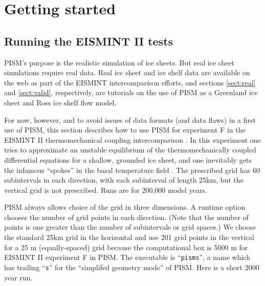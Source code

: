\documentclass[11pt,final]{amsart}
\renewcommand{\t}[1]{\texttt{#1}}
\begin{document}
\clearpage\newpage
\section{Getting started}\label{sect:start}

\subsection{Running the EISMINT II tests}  PISM's purpose is the realistic simulation of ice sheets.  But real ice sheet simulations require real data.  Real ice sheet and ice shelf data are available on the web as part of the EISMINT intercomparison efforts, and sections \ref{sect:real} and \ref{sect:valid}, respectively, are tutorials on the use of PISM as a Greenland ice sheet and Ross ice shelf flow model.

For now, however, and to avoid issues of data formats (and data flaws) in a first use of PISM, this section describes how to use PISM for experiment F in the EISMINT II thermomechanical coupling intercomparison \cite{EISMINT00}.  In this experiment one tries to approximate an unstable equilibrium of the thermomechanically coupled differential equations for a shallow, grounded ice sheet, and one inevitably gets the infamous ``spokes'' in the basal temperature field \cite{BBL,PayneBaldwin}.  The prescribed grid has 60 subintervals in each direction, with each subinterval of length 25km, but the vertical grid is not prescribed.  Runs are for 200,000 model years.

PISM always allows choice of the grid in three dimensions.  A runtime option chooses the number of grid points in each direction.  (Note that the number of points is one greater than the number of subintervals or grid spaces.)  We choose the standard 25km grid in the horizontal and use 201 grid points in the vertical for a 25 m (equally-spaced) grid because the computational box is 5000 m for EISMINT II experiment F in PISM.  The executable is ``\t{pisms}'', a name which has trailing ``\t{s}'' for the ``simplifed geometry mode'' of PISM.  Here is a short 2000 year run.
\end{document}
